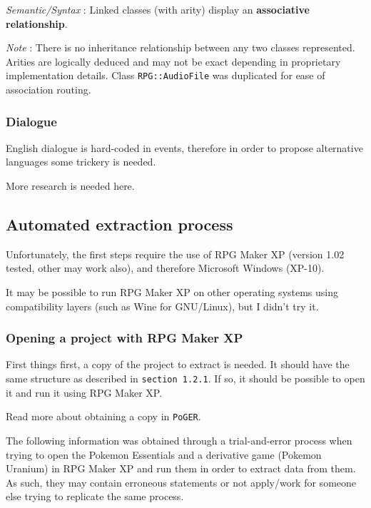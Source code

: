 \documentclass[11pt]{article}
\begin{document}
\textit{Semantic/Syntax} : Linked classes (with arity) display an \textbf{associative relationship}.

\textit{Note} : There is no inheritance relationship between any two classes represented. Arities are logically deduced and may not be exact depending in proprietary implementation details. Class \verb|RPG::AudioFile| was duplicated for ease of association routing.


\subsubsection{Dialogue}

English dialogue is hard-coded in events, therefore in order to propose alternative languages some trickery is needed.

More research is needed here.


\subsection{Automated extraction process}

Unfortunately, the first steps require the use of RPG Maker XP (version 1.02 tested, other may work also), and therefore Microsoft Windows (XP-10).

It may be possible to run RPG Maker XP on other operating systems using compatibility layers (such as Wine for GNU/Linux), but I didn't try it.

\subsubsection{Opening a project with RPG Maker XP}

First things first, a copy of the project to extract is needed. It should have the same structure as described in \verb|section 1.2.1|. If so, it should be possible to open it and run it using RPG Maker XP.

Read more about obtaining a copy in \verb|PoGER|.

The following information was obtained through a trial-and-error process when trying to open the Pokemon Essentials and a derivative game (Pokemon Uranium) in RPG Maker XP and run them in order to extract data from them. As such, they may contain erroneous statements or not apply/work for someone else trying to replicate the same process.
\end{document}
